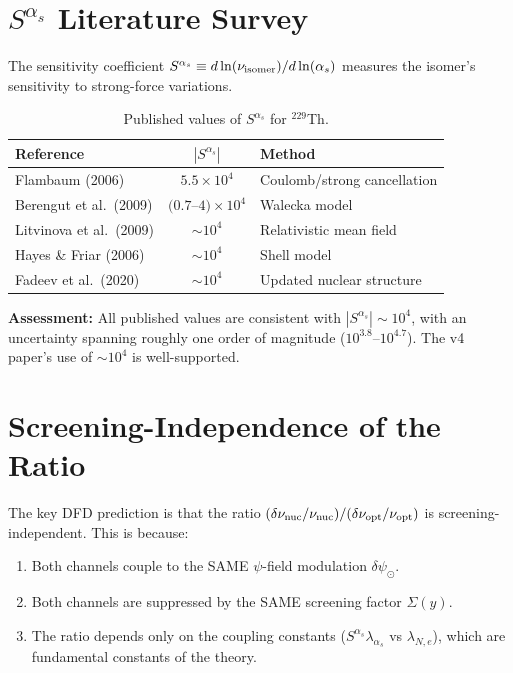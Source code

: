 \documentclass[11pt]{article}
\newcommand{\ee}[1]{\times 10^{#1}}
\begin{document}
\section{$S^{\alpha_s}$ Literature Survey}

The sensitivity coefficient $S^{\alpha_s} \equiv
d\ln(\nu_{\rm isomer})/d\ln(\alpha_s)$ measures the isomer's
sensitivity to strong-force variations.

\begin{table}[H]
\centering
\caption{Published values of $S^{\alpha_s}$ for $^{229}$Th.}
\begin{tabular}{lcl}
\toprule
\textbf{Reference} & $|S^{\alpha_s}|$ & \textbf{Method} \\
\midrule
Flambaum (2006) & $5.5\ee{4}$ & Coulomb/strong cancellation \\
Berengut et al.\ (2009) & $(0.7$--$4)\ee{4}$ & Walecka model \\
Litvinova et al.\ (2009) & $\sim 10^4$ & Relativistic mean field \\
Hayes \& Friar (2006) & $\sim 10^4$ & Shell model \\
Fadeev et al.\ (2020) & $\sim 10^4$ & Updated nuclear structure \\
\bottomrule
\end{tabular}
\end{table}

\textbf{Assessment:}  All published values are consistent with
$|S^{\alpha_s}| \sim 10^4$, with an uncertainty spanning roughly
one order of magnitude ($10^{3.8}$--$10^{4.7}$).  The v4 paper's
use of $\sim 10^4$ is well-supported.

\section{Screening-Independence of the Ratio}

The key DFD prediction is that the ratio
$(\delta\nu_{\rm nuc}/\nu_{\rm nuc})/(\delta\nu_{\rm opt}/\nu_{\rm opt})$
is screening-independent.  This is because:

\begin{enumerate}
\item Both channels couple to the SAME $\psi$-field modulation
  $\delta\psi_\odot$.
\item Both channels are suppressed by the SAME screening factor
  $\Sigma(y)$.
\item The ratio depends only on the coupling constants
  ($S^{\alpha_s}\lambda_{\alpha_s}$ vs $\lambda_{N,e}$), which are
  fundamental constants of the theory.
\end{enumerate}
\end{document}
